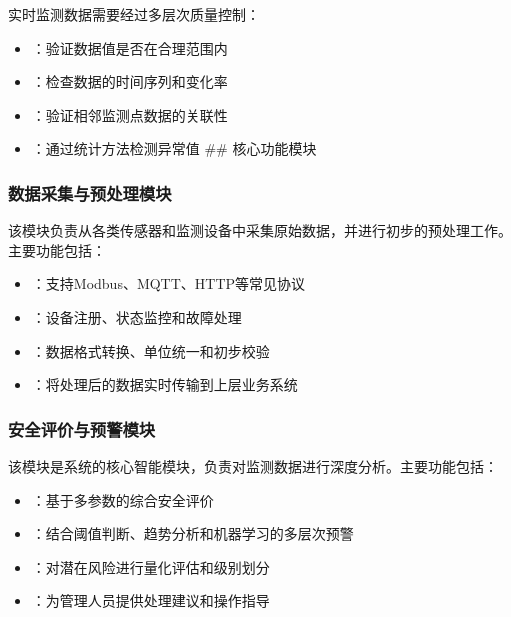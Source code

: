 
实时监测数据需要经过多层次质量控制：

\begin{itemize}
\tightlist
\item
  ：验证数据值是否在合理范围内
\item
  ：检查数据的时间序列和变化率
\item
  ：验证相邻监测点数据的关联性
\item
  ：通过统计方法检测异常值 \#\# 核心功能模块
\end{itemize}

\hypertarget{ux6570ux636eux91c7ux96c6ux4e0eux9884ux5904ux7406ux6a21ux5757}{%
\subsubsection{数据采集与预处理模块}\label{ux6570ux636eux91c7ux96c6ux4e0eux9884ux5904ux7406ux6a21ux5757}}

该模块负责从各类传感器和监测设备中采集原始数据，并进行初步的预处理工作。主要功能包括：

\begin{itemize}
\tightlist
\item
  ：支持Modbus、MQTT、HTTP等常见协议
\item
  ：设备注册、状态监控和故障处理
\item
  ：数据格式转换、单位统一和初步校验
\item
  ：将处理后的数据实时传输到上层业务系统
\end{itemize}

\hypertarget{ux5b89ux5168ux8bc4ux4ef7ux4e0eux9884ux8b66ux6a21ux5757}{%
\subsubsection{安全评价与预警模块}\label{ux5b89ux5168ux8bc4ux4ef7ux4e0eux9884ux8b66ux6a21ux5757}}

该模块是系统的核心智能模块，负责对监测数据进行深度分析。主要功能包括：

\begin{itemize}
\tightlist
\item
  ：基于多参数的综合安全评价
\item
  ：结合阈值判断、趋势分析和机器学习的多层次预警
\item
  ：对潜在风险进行量化评估和级别划分
\item
  ：为管理人员提供处理建议和操作指导
\end{itemize}

